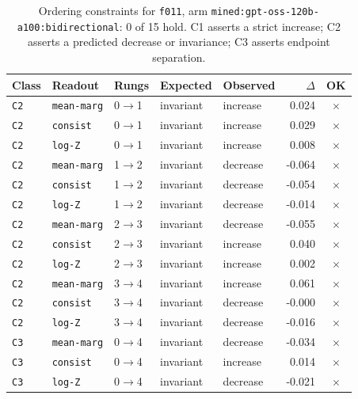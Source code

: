 \documentclass[11pt]{article}
\begin{document}
\begin{table}[htbp]
\centering
\small
\caption{Ordering constraints for \texttt{f011}, arm \texttt{mined:gpt-oss-120b-a100:bidirectional}: 0 of 15 hold. C1 asserts a strict increase; C2 asserts a predicted decrease or invariance; C3 asserts endpoint separation.}
\label{tab:ladder-f011-mined-gpt-oss-120b-a100-bidirectional}
\begin{tabular}{lllllrc}
\toprule
Class & Readout & Rungs & Expected & Observed & $\Delta$ & OK \\
\midrule
\texttt{C2} & \texttt{mean-marg} & 0$\to$1 & invariant & increase & 0.024 & $\times$ \\
\texttt{C2} & \texttt{consist} & 0$\to$1 & invariant & increase & 0.029 & $\times$ \\
\texttt{C2} & \texttt{log-Z} & 0$\to$1 & invariant & increase & 0.008 & $\times$ \\
\texttt{C2} & \texttt{mean-marg} & 1$\to$2 & invariant & decrease & -0.064 & $\times$ \\
\texttt{C2} & \texttt{consist} & 1$\to$2 & invariant & decrease & -0.054 & $\times$ \\
\texttt{C2} & \texttt{log-Z} & 1$\to$2 & invariant & decrease & -0.014 & $\times$ \\
\texttt{C2} & \texttt{mean-marg} & 2$\to$3 & invariant & decrease & -0.055 & $\times$ \\
\texttt{C2} & \texttt{consist} & 2$\to$3 & invariant & increase & 0.040 & $\times$ \\
\texttt{C2} & \texttt{log-Z} & 2$\to$3 & invariant & increase & 0.002 & $\times$ \\
\texttt{C2} & \texttt{mean-marg} & 3$\to$4 & invariant & increase & 0.061 & $\times$ \\
\texttt{C2} & \texttt{consist} & 3$\to$4 & invariant & decrease & -0.000 & $\times$ \\
\texttt{C2} & \texttt{log-Z} & 3$\to$4 & invariant & decrease & -0.016 & $\times$ \\
\texttt{C3} & \texttt{mean-marg} & 0$\to$4 & invariant & decrease & -0.034 & $\times$ \\
\texttt{C3} & \texttt{consist} & 0$\to$4 & invariant & increase & 0.014 & $\times$ \\
\texttt{C3} & \texttt{log-Z} & 0$\to$4 & invariant & decrease & -0.021 & $\times$ \\
\bottomrule
\end{tabular}
\end{table}
\end{document}
